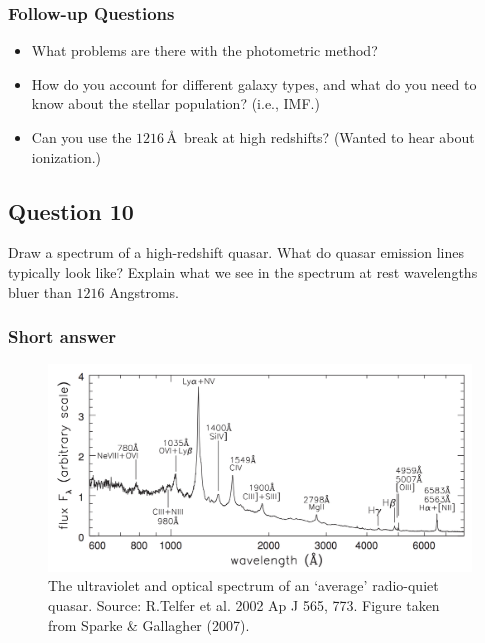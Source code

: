 \documentclass[a4paper,10pt]{article}
\begin{document}
\subsubsection{Follow-up Questions}

\begin{itemize}
    \item What problems are there with the photometric method?
    \item How do you account for different galaxy types, and what do you need to know about the stellar population? (i.e., IMF.)
    \item Can you use the $1216$\,\AA~break at high redshifts? (Wanted to hear about ionization.)
\end{itemize}



\newpage
\subsection{Question 10}

Draw a spectrum of a high-redshift quasar. What do quasar emission lines typically look like? Explain what we see in the spectrum at rest wavelengths bluer than $1216$ Angstroms.

\subsubsection{Short answer}

\begin{figure}[h]
    \centering
    \includegraphics[width=16cm]{figures/QSO_radioquiet.png}
    \caption{\footnotesize{The ultraviolet and optical spectrum of an `average' radio-quiet quasar. Source: R.Telfer et al. 2002 Ap J 565, 773. Figure taken from Sparke \& Gallagher (2007).}}
    \label{fig:qsoradioquiet}
\end{figure}
\end{document}
